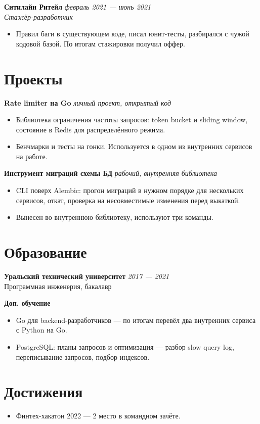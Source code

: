 \documentclass[a4paper,10pt]{article}
\begin{document}
\textbf{Ситилайн Ритейл} \hfill \textit{февраль 2021 --- июнь 2021}\\
\textit{Стажёр-разработчик}
\begin{itemize}
    \item Правил баги в существующем коде, писал юнит-тесты, разбирался с чужой
          кодовой базой. По итогам стажировки получил оффер.
\end{itemize}

\section*{Проекты}

\textbf{Rate limiter на Go} \hfill \textit{личный проект, открытый код}
\begin{itemize}
    \item Библиотека ограничения частоты запросов: token bucket и sliding window,
          состояние в Redis для распределённого режима.
    \item Бенчмарки и тесты на гонки. Используется в одном из внутренних сервисов
          на работе.
\end{itemize}

\textbf{Инструмент миграций схемы БД} \hfill \textit{рабочий, внутренняя библиотека}
\begin{itemize}
    \item CLI поверх Alembic: прогон миграций в нужном порядке для нескольких
          сервисов, откат, проверка на несовместимые изменения перед выкаткой.
    \item Вынесен во внутреннюю библиотеку, используют три команды.
\end{itemize}

\section*{Образование}

\textbf{Уральский технический университет} \hfill \textit{2017 --- 2021}\\
Программная инженерия, бакалавр

\textbf{Доп. обучение}
\begin{itemize}
    \item Go для backend-разработчиков --- по итогам перевёл два внутренних сервиса
          с Python на Go.
    \item PostgreSQL: планы запросов и оптимизация --- разбор slow query log,
          переписывание запросов, подбор индексов.
\end{itemize}

\section*{Достижения}

\begin{itemize}
    \item Финтех-хакатон 2022 --- 2 место в командном зачёте.
\end{itemize}
\end{document}
